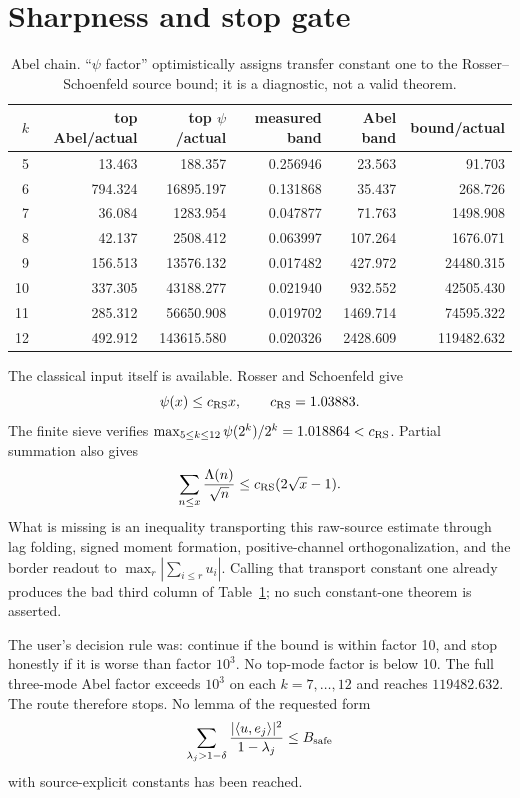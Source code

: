 \documentclass[11pt]{article}
\theoremstyle{remark}
\begin{document}
\section{Sharpness and stop gate}

\begin{table}[ht]
\centering
\caption{Abel chain.  ``$\psi$ factor'' optimistically assigns transfer
constant one to the Rosser--Schoenfeld source bound; it is a diagnostic,
not a valid theorem.}
\label{tab:abel}
\small
\begin{tabular}{@{}rrrrrr@{}}
\toprule
$k$&top Abel/actual&top $\psi$/actual&
measured band&Abel band&bound/actual\\
\midrule
5 &13.463&188.357&0.256946&23.563&91.703\\
6 &794.324&16895.197&0.131868&35.437&268.726\\
7 &36.084&1283.954&0.047877&71.763&1498.908\\
8 &42.137&2508.412&0.063997&107.264&1676.071\\
9 &156.513&13576.132&0.017482&427.972&24480.315\\
10&337.305&43188.277&0.021940&932.552&42505.430\\
11&285.312&56650.908&0.019702&1469.714&74595.322\\
12&492.912&143615.580&0.020326&2428.609&119482.632\\
\bottomrule
\end{tabular}
\end{table}

The classical input itself is available.  Rosser and Schoenfeld give
\[
 \psi(x)\le c_{\rm RS}x,\qquad c_{\rm RS}=1.03883.
\]
The finite sieve verifies
$\max_{5\le k\le12}\psi(2^k)/2^k=1.018864<c_{\rm RS}$.
Partial summation also gives
\[
 \sum_{n\le x}\frac{\Lambda(n)}{\sqrt n}
 \le c_{\rm RS}(2\sqrt{x}-1).
\]
What is missing is an inequality transporting this raw-source estimate
through lag folding, signed moment formation, positive-channel
orthogonalization, and the border readout to
$\max_r|\sum_{i\le r}u_i|$.  Calling that transport constant one already
produces the bad third column of Table~\ref{tab:abel}; no such
constant-one theorem is asserted.

The user's decision rule was: continue if the bound is within factor
10, and stop honestly if it is worse than factor $10^3$.  No top-mode
factor is below 10.  The full three-mode Abel factor exceeds $10^3$ on
each $k=7,\ldots,12$ and reaches $119482.632$.  The route therefore
stops.  No lemma of the requested form
\[
 \sum_{\lambda_j>1-\delta}
 \frac{|\langle u,e_j\rangle|^2}{1-\lambda_j}\le B_{\rm safe}
\]
with source-explicit constants has been reached.
\end{document}
